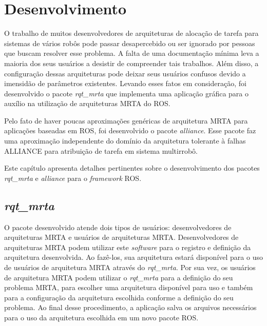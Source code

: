 \chapter[Desenvolvimento]{Desenvolvimento} \label{cap:desenvolvimento}
    O trabalho de muitos desenvolvedores de arquiteturas de alocação de tarefa para sistemas de vários robôs pode passar desapercebido ou ser ignorado por pessoas que buscam resolver esse problema. A falta de uma documentação mínima leva a maioria dos seus usuários a desistir de compreender tais trabalhos. Além disso, a configuração dessas arquiteturas pode deixar seus usuários confusos devido a imensidão de parâmetros existentes. Levando esses fatos em consideração, foi desenvolvido o pacote \textit{rqt\_mrta} que implementa uma aplicação gráfica para o auxílio na utilização de arquiteturas MRTA do ROS.
    
    Pelo fato de haver poucas aproximações genéricas de arquitetura MRTA para aplicações baseadas em ROS, foi desenvolvido o pacote \textit{alliance}. Esse pacote faz uma aproximação independente do domínio da arquitetura tolerante à falhas ALLIANCE \cite{ref:parker1998alliance} para atribuição de tarefa em sistema multirrobô. 
        
    Este capítulo apresenta detalhes pertinentes sobre o desenvolvimento dos pacotes \textit{rqt\_mrta} e \textit{alliance} para o \textit{framework} ROS.
    
    
    \section{\textit{rqt\_mrta}}
        O pacote desenvolvido atende dois tipos de usuários: desenvolvedores de arquiteturas MRTA e usuários de arquiteturas MRTA. Desenvolvedores de arquiteturas MRTA podem utilizar este \textit{software} para o registro e definição da arquitetura desenvolvida. Ao fazê-los, sua arquitetura estará disponível para o uso de usuários de arquitetura MRTA através do \textit{rqt\_mrta}. Por sua vez, os usuários de arquitetura MRTA podem utilizar o \textit{rqt\_mrta} para a definição do seu problema MRTA, para escolher uma arquitetura disponível para uso e também para a configuração da arquitetura escolhida conforme a definição do seu problema. Ao final desse procedimento, a aplicação salva os arquivos necessários para o uso da arquitetura escolhida em um novo pacote ROS.
        
